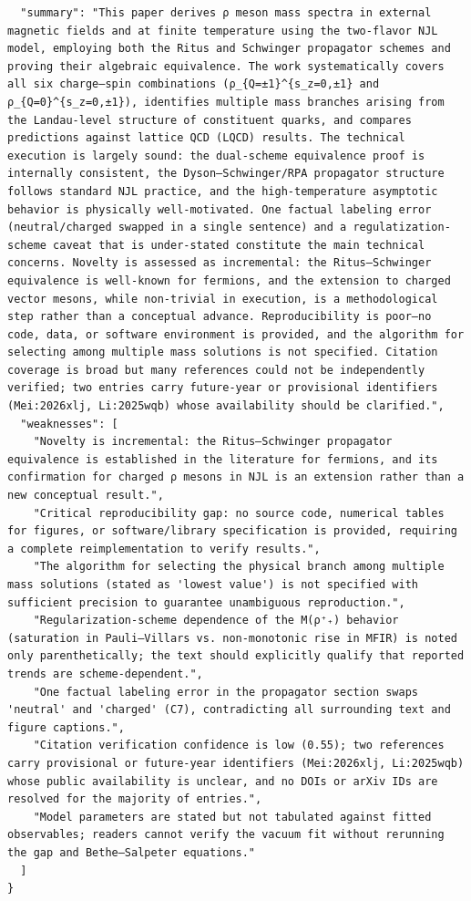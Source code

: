 \documentclass[11pt]{article}
\begin{document}
\begin{verbatim}
  "summary": "This paper derives ρ meson mass spectra in external magnetic fields and at finite temperature using the two-flavor NJL model, employing both the Ritus and Schwinger propagator schemes and proving their algebraic equivalence. The work systematically covers all six charge–spin combinations (ρ_{Q=±1}^{s_z=0,±1} and ρ_{Q=0}^{s_z=0,±1}), identifies multiple mass branches arising from the Landau-level structure of constituent quarks, and compares predictions against lattice QCD (LQCD) results. The technical execution is largely sound: the dual-scheme equivalence proof is internally consistent, the Dyson–Schwinger/RPA propagator structure follows standard NJL practice, and the high-temperature asymptotic behavior is physically well-motivated. One factual labeling error (neutral/charged swapped in a single sentence) and a regulatization-scheme caveat that is under-stated constitute the main technical concerns. Novelty is assessed as incremental: the Ritus–Schwinger equivalence is well-known for fermions, and the extension to charged vector mesons, while non-trivial in execution, is a methodological step rather than a conceptual advance. Reproducibility is poor—no code, data, or software environment is provided, and the algorithm for selecting among multiple mass solutions is not specified. Citation coverage is broad but many references could not be independently verified; two entries carry future-year or provisional identifiers (Mei:2026xlj, Li:2025wqb) whose availability should be clarified.",
  "weaknesses": [
    "Novelty is incremental: the Ritus–Schwinger propagator equivalence is established in the literature for fermions, and its confirmation for charged ρ mesons in NJL is an extension rather than a new conceptual result.",
    "Critical reproducibility gap: no source code, numerical tables for figures, or software/library specification is provided, requiring a complete reimplementation to verify results.",
    "The algorithm for selecting the physical branch among multiple mass solutions (stated as 'lowest value') is not specified with sufficient precision to guarantee unambiguous reproduction.",
    "Regularization-scheme dependence of the M(ρ⁺₊) behavior (saturation in Pauli–Villars vs. non-monotonic rise in MFIR) is noted only parenthetically; the text should explicitly qualify that reported trends are scheme-dependent.",
    "One factual labeling error in the propagator section swaps 'neutral' and 'charged' (C7), contradicting all surrounding text and figure captions.",
    "Citation verification confidence is low (0.55); two references carry provisional or future-year identifiers (Mei:2026xlj, Li:2025wqb) whose public availability is unclear, and no DOIs or arXiv IDs are resolved for the majority of entries.",
    "Model parameters are stated but not tabulated against fitted observables; readers cannot verify the vacuum fit without rerunning the gap and Bethe–Salpeter equations."
  ]
}
\end{verbatim}
\end{document}
